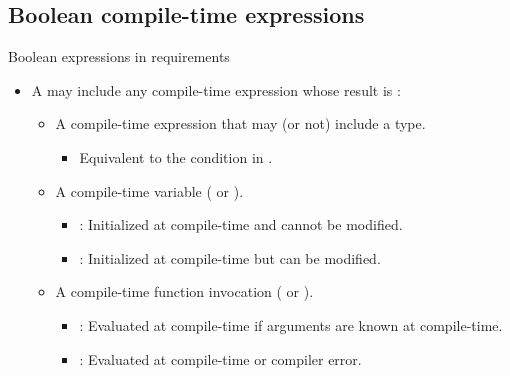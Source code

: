 \subsection{Boolean compile-time expressions}

\begin{frame}[t,fragile]{Boolean expressions in requirements}
\begin{itemize}
  \item A  may include any compile-time
        expression whose result is :
    \begin{itemize}
      \item A compile-time expression that may (or not) include a type.
        \begin{itemize}
          \item Equivalent to the condition in .
        \end{itemize}

      \item A compile-time variable 
            ( or ).
        \begin{itemize}
          \item {}: Initialized at compile-time 
                and cannot be modified.
          \item {}: Initialized at compile-time 
                but can be modified.
        \end{itemize}

      \item A compile-time function invocation 
            ( or ).
        \begin{itemize}
          \item {}: Evaluated at compile-time if arguments
                are known at compile-time.
          \item {}: Evaluated at compile-time or
                compiler error.
        \end{itemize}
    \end{itemize}
\end{itemize}
\end{frame}



